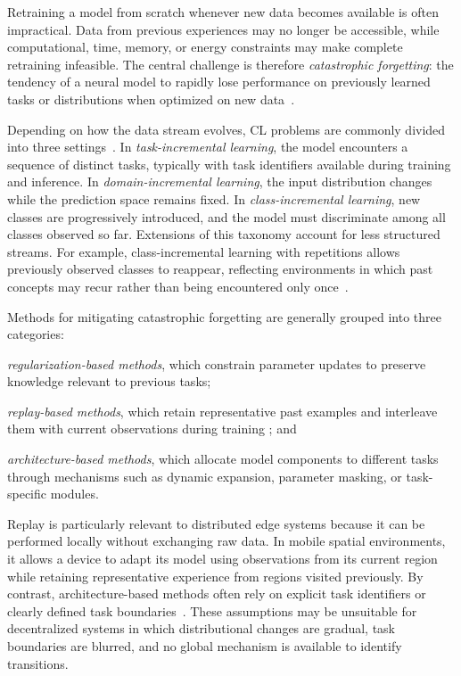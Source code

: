 Retraining a model from scratch whenever new data becomes available 
 is often impractical.
%
Data from previous experiences may no longer be accessible, while computational,
 time, memory, or energy constraints may make complete retraining infeasible.
%
The central challenge is therefore \emph{catastrophic forgetting}: 
 the tendency of a neural model to rapidly lose performance on previously learned tasks 
 or distributions when optimized on new data~\cite{french1999catastrophic}.

Depending on how the data stream evolves, 
 \gls{CL} problems are commonly divided into three settings~\cite{vandeven2022three}.
%
In \emph{task-incremental learning}, 
 the model encounters a sequence of distinct tasks, 
 typically with task identifiers available during training and inference.
%
In \emph{domain-incremental learning}, 
 the input distribution changes while the prediction space remains fixed.
%
In \emph{class-incremental learning}, 
 new classes are progressively introduced,
 and the model must discriminate among all classes observed so far.
%
Extensions of this taxonomy account for less structured streams.
%
For example, 
 class-incremental learning with repetitions allows previously observed classes to reappear, 
 reflecting environments in which past concepts may recur rather than being encountered 
 only once~\cite{hemati2023class}.

Methods for mitigating catastrophic forgetting are generally grouped 
 into three categories:
%
\begin{enumerate*}[label=(\roman*)]
    \item \emph{regularization-based methods}, which constrain parameter updates
    to preserve knowledge relevant to previous tasks;
    \item \emph{replay-based methods}, which retain representative past examples
    and interleave them with current observations during training
    \cite{lopezpaz2017gradient,rebuffi2017icarl}; and
    \item \emph{architecture-based methods}, which allocate model components to
    different tasks through mechanisms such as dynamic expansion, parameter
    masking, or task-specific modules.
\end{enumerate*}

Replay is particularly relevant to distributed edge systems 
 because it can be performed locally without exchanging raw data.
%
In mobile spatial environments, 
 it allows a device to adapt its model using observations from its current region 
 while retaining representative experience from regions visited previously.
%
By contrast, 
 architecture-based methods often rely on explicit task identifiers or clearly defined task 
 boundaries~\cite{rusu2016progressive,yoon2018lifelong,mallya2018packnet,mallya2018piggyback}.
%
These assumptions may be unsuitable for decentralized systems 
 in which distributional changes are gradual, task boundaries are blurred, 
 and no global mechanism is available to identify transitions.
